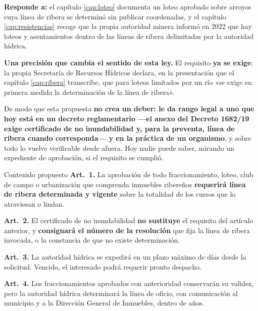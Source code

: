 \textbf{Responde a:} el capítulo \ref{cap:loteo} documenta un loteo aprobado sobre arroyos
cuya línea de ribera se determinó sin publicar coordenadas, y el capítulo \ref{cap:resistencias}
recoge que la propia autoridad minera informó en 2022 que hay loteos y asentamientos dentro de
las líneas de ribera delimitadas por la autoridad hídrica.

\begin{cautela}
\textbf{Una precisión que cambia el sentido de esta ley.} El requisito \textbf{ya se exige}: la
propia Secretaría de Recursos Hídricos declara, en la presentación que el capítulo
\ref{cap:ribera} transcribe, que para loteos limitados por un río «se exige en primera medida
la determinación de la línea de ribera».

De modo que esta propuesta \textbf{no crea un deber: le da rango legal a uno que hoy está en un decreto reglamentario ---el anexo del Decreto 1682/19 exige certificado de no inundabilidad y, para la preventa, línea de ribera cuando corresponda--- y en la práctica de un organismo}, y sobre todo lo vuelve verificable desde afuera. Hoy nadie puede
saber, mirando un expediente de aprobación, si el requisito se cumplió.
\end{cautela}

\begin{ficha}{Contenido propuesto}
\textbf{Art.\ 1.} La aprobación de todo fraccionamiento, loteo, club de campo o urbanización
que comprenda inmuebles ribereños \textbf{requerirá línea de ribera determinada y vigente}
sobre la totalidad de los cursos que lo atraviesan o lindan.

\textbf{Art.\ 2.} El certificado de no inundabilidad \textbf{no sustituye} el requisito del
artículo anterior, y \textbf{consignará el número de la resolución} que fija la línea de ribera
invocada, o la constancia de que no existe determinación.

\textbf{Art.\ 3.} La autoridad hídrica se expedirá en un plazo máximo de
\underline{\hspace{1.2cm}} días desde la solicitud. Vencido, el interesado podrá requerir
pronto despacho.

\textbf{Art.\ 4.} Los fraccionamientos aprobados con anterioridad conservarán su validez, pero
la autoridad hídrica determinará la línea de oficio, con comunicación al municipio y a la
Dirección General de Inmuebles, dentro de \underline{\hspace{1.2cm}} años.
\end{ficha}

